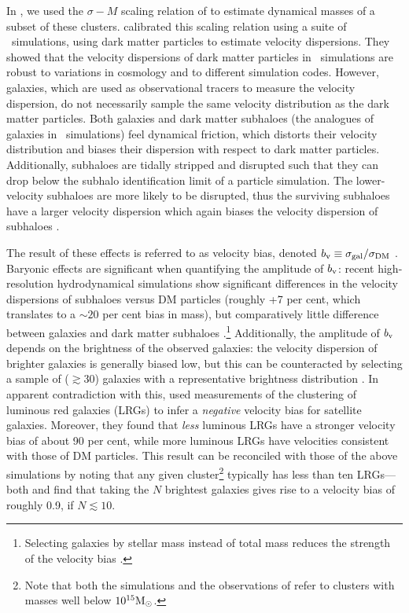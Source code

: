 In \cite{sifon13}, we used the $\sigma-M$ scaling relation of \cite{evrard08} to estimate 
dynamical masses of a subset of these clusters. \cite{evrard08} calibrated this scaling relation using a suite of \Nbody\ simulations, using dark matter particles to estimate velocity dispersions. They showed that the velocity dispersions of dark matter particles in \Nbody\ simulations are robust to variations in cosmology and to different simulation codes. However, galaxies, which are used as observational tracers to measure the velocity dispersion, do not necessarily sample the same velocity distribution as the dark matter particles. Both galaxies and dark matter subhaloes (the analogues of galaxies in \Nbody\ simulations) feel dynamical friction, which distorts their velocity distribution and biases their dispersion with respect to dark matter particles. Additionally, subhaloes are tidally stripped and disrupted such that they can drop below the subhalo identification limit of a particle simulation. The lower-velocity subhaloes are more likely to be disrupted, thus the surviving subhaloes have a larger velocity dispersion which again biases the velocity dispersion of subhaloes \citep[e.g.,][]{faltenbacher06}.

The result of these effects is referred to as velocity bias, denoted $b_{\rm v}\equiv\sigma_{\rm gal}/\sigma_{\rm DM}$ \citep[e.g.,][]{carlberg94,colin00}. Baryonic effects are significant when quantifying the amplitude of $b_{\rm v}$: recent high-resolution hydrodynamical simulations show significant differences in the velocity dispersions of subhaloes versus DM particles (roughly +7 per cent, which translates to a $\sim20$ per cent bias in mass), but comparatively little difference between galaxies and dark matter subhaloes \citep[e.g.,][]{lau10,munari13,wu13}.\footnote{Selecting galaxies by stellar mass instead of total mass reduces the strength of the velocity bias \citep[e.g.,][]{faltenbacher06,lau10}.} Additionally, the amplitude of $b_{\rm v}$ depends on the brightness of the observed galaxies: the velocity dispersion of brighter galaxies is generally biased low, but this can be counteracted by selecting a sample of ($\gtrsim30$) galaxies with a representative brightness distribution \citep{old13,wu13}. In apparent contradiction with this, \cite{guo15_vbias,guo15_clustering} used measurements of the clustering of luminous red galaxies (LRGs) to infer a \emph{negative} velocity bias for satellite galaxies. Moreover, they found that \emph{less} luminous LRGs have a stronger velocity bias of about 90 per cent, while more luminous LRGs have velocities consistent with those of DM particles. This result can be reconciled with those of the above simulations by noting that any given cluster\footnote{Note that both the simulations and the observations of \cite{guo15_vbias,guo15_clustering} refer to clusters with masses well below $10^{15}{\rm M}_\odot$.} typically has less than ten LRGs---both \cite{old13} and \cite{wu13} find that taking the $N$ brightest galaxies gives rise to a velocity bias of roughly 0.9, if $N\lesssim10$.

